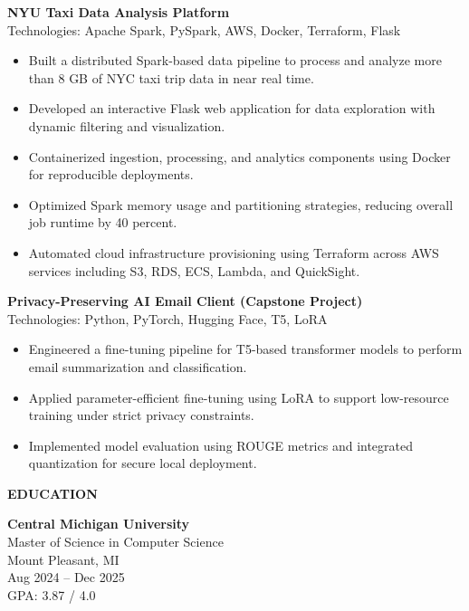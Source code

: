 \documentclass[letterpaper,12pt]{article}
\begin{document}
\vspace{4pt}

\textbf{NYU Taxi Data Analysis Platform} \\
Technologies: Apache Spark, PySpark, AWS, Docker, Terraform, Flask \\
\begin{itemize}
  \item Built a distributed Spark-based data pipeline to process and analyze more than 8 GB of NYC taxi trip data in near real time.
  \item Developed an interactive Flask web application for data exploration with dynamic filtering and visualization.
  \item Containerized ingestion, processing, and analytics components using Docker for reproducible deployments.
  \item Optimized Spark memory usage and partitioning strategies, reducing overall job runtime by 40 percent.
  \item Automated cloud infrastructure provisioning using Terraform across AWS services including S3, RDS, ECS, Lambda, and QuickSight.
\end{itemize}

\vspace{4pt}

\textbf{Privacy-Preserving AI Email Client (Capstone Project)} \\
Technologies: Python, PyTorch, Hugging Face, T5, LoRA \\
\begin{itemize}
  \item Engineered a fine-tuning pipeline for T5-based transformer models to perform email summarization and classification.
  \item Applied parameter-efficient fine-tuning using LoRA to support low-resource training under strict privacy constraints.
  \item Implemented model evaluation using ROUGE metrics and integrated quantization for secure local deployment.
\end{itemize}
\vspace{6pt}
\textbf{EDUCATION}

\vspace{4pt}

\textbf{Central Michigan University} \\
Master of Science in Computer Science \\
Mount Pleasant, MI \\
Aug 2024 -- Dec 2025 \\
GPA: 3.87 / 4.0
\end{document}
